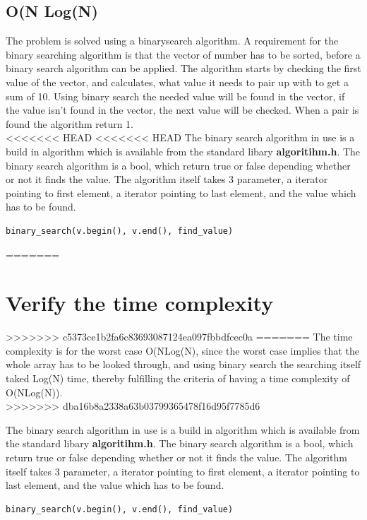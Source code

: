 \subsection{O(N Log(N)}
The problem is solved using a binarysearch algorithm. A requirement for the binary searching algorithm is that the vector of number has to be sorted, before a binary search algorithm can be applied. 
The algorithm starts by checking the first value of the vector, and calculates, what value it needs to pair up with to get a sum of 10.  Using binary search the needed value will be found in the vector, if the value isn't found in the vector, the next value will be checked.  When a pair is found the algorithm return 1. 
\\

<<<<<<< HEAD
<<<<<<< HEAD
The binary search algorithm in use is a build in algorithm which is available from the standard libary \textbf{algoritihm.h}. The binary search algorithm is a bool, which return true or false depending whether or not it finds the value.  The algorithm itself takes 3 parameter, 	a iterator pointing to first element, a iterator pointing to last element, and the value which has to be found. 
\begin{lstlisting}
binary_search(v.begin(), v.end(), find_value)
\end{lstlisting}

=======
\section{Verify the time complexity}
>>>>>>> c5373ce1b2fa6c83693087124ea097fbbdfcec0a
=======
The time complexity is for the worst case O(NLog(N), since the worst case implies that the whole array has to be looked through, and using binary search the  searching itself taked Log(N) time, thereby fulfilling the criteria of having a time complexity of O(NLog(N)).    
\\
>>>>>>> dba16b8a2338a63b03799365478f16d95f7785d6

The binary search algorithm in use is a build in algorithm which is available from the standard libary \textbf{algoritihm.h}. The binary search algorithm is a bool, which return true or false depending whether or not it finds the value.  The algorithm itself takes 3 parameter, 	a iterator pointing to first element, a iterator pointing to last element, and the value which has to be found. 
\begin{lstlisting}
binary_search(v.begin(), v.end(), find_value)
\end{lstlisting}
\newpage
